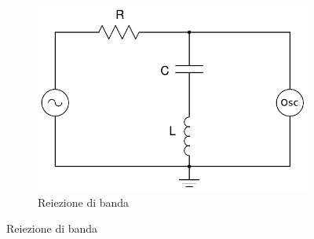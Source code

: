 \begin{figure}[h]
\begin{subfigure}[b]{0.3\textwidth}
                \includegraphics[width=\textwidth]{s_notch.pdf}
                \caption{Reiezione di banda}
                \label{fig:notch}
        \end{subfigure}
\end{figure}
